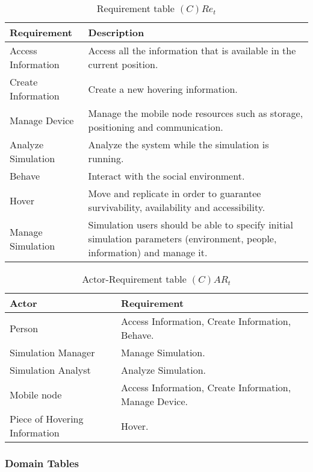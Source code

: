 \begin{table}[H]
	\centering
	\begin{tabular}{|p{4cm}|p{8cm}|}
			\hline
			\textbf{Requirement} & \textbf{Description} \\
			\hline
			Access Information & Access all the information that is available in the
			current position. \\
			\hline
			Create Information & Create a new hovering information. \\
			\hline
			Manage Device & Manage the mobile node resources such as storage,
			positioning and communication.  \\
			\hline
			Analyze Simulation & Analyze the system while the simulation is running.
			\\
			\hline
			Behave & Interact with the social environment. \\
			\hline
			Hover & Move and replicate in order to guarantee survivability, availability
			and accessibility. \\
			\hline
			Manage Simulation & Simulation users should be able to specify initial
			simulation parameters (environment, people, information) and manage it.
			\\
			\hline
		\end{tabular}
	\caption{Requirement table $(C)Re_t$}
	\label{tab:cact}
\end{table}

\begin{table}[H]
	\centering
	\begin{tabular}{|p{4cm}|p{8cm}|}
			\hline
			\textbf{Actor} & \textbf{Requirement} \\
			\hline
			Person & Access Information, Create Information, Behave. \\
			\hline
			Simulation Manager & Manage Simulation. \\
			\hline
			Simulation Analyst & Analyze Simulation. \\
			\hline
			Mobile node & Access Information, Create Information, Manage Device. \\
			\hline
			Piece of Hovering Information & Hover. \\
			\hline
		\end{tabular}
	\caption{Actor-Requirement table $(C)AR_t$}
	\label{tab:cart}
\end{table}

\subsubsection{Domain Tables}

